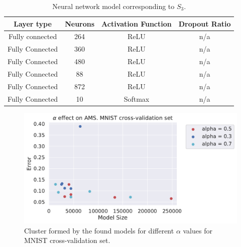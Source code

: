 \documentclass[12pt]{elsart}%
\begin{document}
\begin{table}[!htb]
\begin{center}
\begin{tabular}{| c | c | c | c |}
\hline
Layer type & Neurons & Activation Function & Dropout Ratio \\
\hline
Fully connected & 264 & ReLU & n/a \\
Fully Connected & 360 & ReLU & n/a\\
Fully Connected & 480 & ReLU & n/a\\
Fully Connected & 88 & ReLU & n/a\\
Fully Connected & 872 & ReLU & n/a\\
Fully Connected & 10 & Softmax & n/a\\
\hline
\end{tabular}
\end{center}
\caption{Neural network model corresponding to $S_3$.}
\label{table:neural_network_model_S3}
\end{table}

\pagebreak

\begin{figure}[!h]
\centering
\includegraphics[scale=0.7]{Figures/alpha_mnist_cvset.pdf}
\caption{Cluster formed by the found models for different $\alpha$ values for MNIST cross-validation set.}
\label{fig:alpha_mnist_cluster_cvset}
\end{figure}
\end{document}
